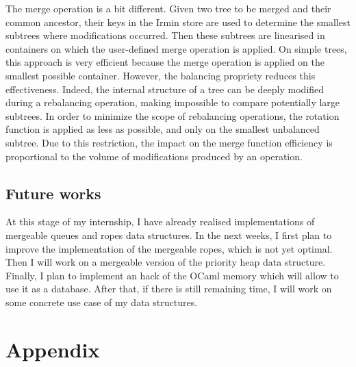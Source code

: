 \documentclass{article}
\renewcommand{\-}{\hyp}
\newcommand{\irmin}{Irmin\xspace}
\newcommand{\ocaml}{OCaml\xspace}
\begin{document}
The merge operation is a bit different.
Given two tree to be merged and their common ancestor, their keys in the \irmin store are used to determine the smallest subtrees where modifications occurred.
Then these subtrees are linearised in containers on which the user-defined merge operation is applied.
On simple trees, this approach is very efficient because the merge operation is applied on the smallest possible container.
However, the balancing propriety reduces this effectiveness.
Indeed, the internal structure of a tree can be deeply modified during a rebalancing operation, making impossible to compare potentially large subtrees.
In order to minimize the scope of rebalancing operations, the rotation function is applied as less as possible, and only on the smallest unbalanced subtree.
Due to this restriction, the impact on the merge function efficiency is proportional to the volume of modifications produced by  an operation.

\subsection{Future works}

At this stage of my internship, I have already realised implementations of mergeable  queues and ropes data structures.
In the next weeks, I first plan to improve the implementation of the mergeable ropes, which is not yet optimal.
Then I will work on a mergeable version of the priority heap data structure.
Finally, I plan to implement an hack of the \ocaml memory which will allow to use it as a database.
After that, if there is still remaining time, I will work on some concrete use case of my data structures.

\nocite{*}



\newpage

\section*{Appendix}
\addtocounter{section}{1}
\setcounter{subsection}{0}
\renewcommand{\thesubsection}{\Alph{subsection}}
\end{document}
